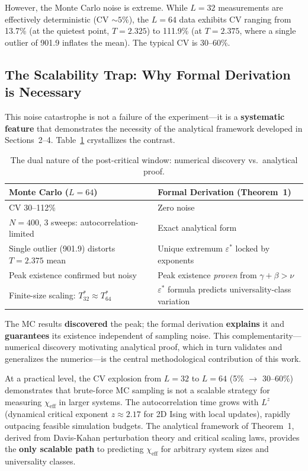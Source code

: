\documentclass[aps,prl,twocolumn,superscriptaddress,byrevtex]{article}
\begin{document}
However, the Monte Carlo noise is extreme. While $L=32$ measurements are effectively deterministic (CV $\sim 5\%$), the $L=64$ data exhibits CV ranging from 13.7\% (at the quietest point, $T=2.325$) to 111.9\% (at $T=2.375$, where a single outlier of 901.9 inflates the mean). The typical CV is 30--60\%.

\subsection{The Scalability Trap: Why Formal Derivation is Necessary}

This noise catastrophe is not a failure of the experiment---it is a \textbf{systematic feature} that demonstrates the necessity of the analytical framework developed in Sections~2--4. Table~\ref{tab:contrast} crystallizes the contrast.

\begin{table}[t]
\centering
\caption{The dual nature of the post-critical window: numerical discovery vs.\ analytical proof.}
\label{tab:contrast}
\begin{tabular}{p{}p{}}
\toprule
\textbf{Monte Carlo ($L=64$)} & \textbf{Formal Derivation (Theorem~1)} \\
\midrule
CV 30--112\% & Zero noise \\
$N=400$, 3 sweeps: autocorrelation-limited & Exact analytical form \\
Single outlier (901.9) distorts $T=2.375$ mean & Unique extremum $\varepsilon^*$ locked by exponents \\
Peak existence confirmed but noisy & Peak existence \emph{proven} from $\gamma+\beta>\nu$ \\
Finite-size scaling: $T^*_{32}\approx T^*_{64}$ & $\varepsilon^*$ formula predicts universality-class variation \\
\bottomrule
\end{tabular}
\end{table}

The MC results \textbf{discovered} the peak; the formal derivation \textbf{explains} it and \textbf{guarantees} its existence independent of sampling noise. This complementarity---numerical discovery motivating analytical proof, which in turn validates and generalizes the numerics---is the central methodological contribution of this work.

At a practical level, the CV explosion from $L=32$ to $L=64$ (5\% $\to$ 30--60\%) demonstrates that brute-force MC sampling is not a scalable strategy for measuring $\chi_{\text{eff}}$ in larger systems. The autocorrelation time grows with $L^z$ (dynamical critical exponent $z \approx 2.17$ for 2D Ising with local updates), rapidly outpacing feasible simulation budgets. The analytical framework of Theorem~1, derived from Davis-Kahan perturbation theory and critical scaling laws, provides the \textbf{only scalable path} to predicting $\chi_{\text{eff}}$ for arbitrary system sizes and universality classes.
\end{document}
